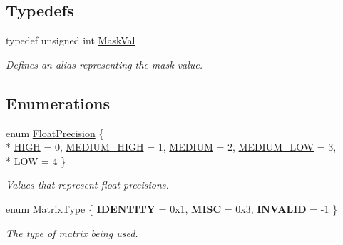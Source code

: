 \subsection*{Typedefs}
\begin{DoxyCompactItemize}
\item 
\hypertarget{group___scalar_math_consts_gab1b391d7995f105a3340b15c6c9d0763}{}typedef unsigned int \hyperlink{group___scalar_math_consts_gab1b391d7995f105a3340b15c6c9d0763}{Mask\+Val}\label{group___scalar_math_consts_gab1b391d7995f105a3340b15c6c9d0763}

\begin{DoxyCompactList}\small\item\em Defines an alias representing the mask value. \end{DoxyCompactList}\end{DoxyCompactItemize}
\subsection*{Enumerations}
\begin{DoxyCompactItemize}
\item 
enum \hyperlink{group___scalar_math_consts_ga4b1c9ff152a66c5d35b4767a57782f63}{Float\+Precision} \{ \\*
\hyperlink{group___scalar_math_consts_gga4b1c9ff152a66c5d35b4767a57782f63a244eee80507aa2a13170d96d214b9104}{H\+I\+G\+H} = 0, 
\hyperlink{group___scalar_math_consts_gga4b1c9ff152a66c5d35b4767a57782f63a8a0bf373c4216f2f3fcc42b6e80f44c2}{M\+E\+D\+I\+U\+M\+\_\+\+H\+I\+G\+H} = 1, 
\hyperlink{group___scalar_math_consts_gga4b1c9ff152a66c5d35b4767a57782f63a01c38b422afce79a2ddb938cf9971b76}{M\+E\+D\+I\+U\+M} = 2, 
\hyperlink{group___scalar_math_consts_gga4b1c9ff152a66c5d35b4767a57782f63ad7e5e2d6d083857d80ec72cb9ff9df15}{M\+E\+D\+I\+U\+M\+\_\+\+L\+O\+W} = 3, 
\\*
\hyperlink{group___scalar_math_consts_gga4b1c9ff152a66c5d35b4767a57782f63a9db1590eafa097de6665238345fdf63e}{L\+O\+W} = 4
 \}
\begin{DoxyCompactList}\small\item\em Values that represent float precisions. \end{DoxyCompactList}\end{DoxyCompactItemize}
{\bf }\par
\begin{DoxyCompactItemize}
\item 
\hypertarget{group___s_i_s_d_mat_math_ga0434ae8f7ee0d8d40277184552eebef4}{}enum \hyperlink{group___s_i_s_d_mat_math_ga0434ae8f7ee0d8d40277184552eebef4}{Matrix\+Type} \{ {\bfseries I\+D\+E\+N\+T\+I\+T\+Y} = 0x1, 
{\bfseries M\+I\+S\+C} = 0x3, 
{\bfseries I\+N\+V\+A\+L\+I\+D} = -\/1
 \}\label{group___s_i_s_d_mat_math_ga0434ae8f7ee0d8d40277184552eebef4}

\begin{DoxyCompactList}\small\item\em The type of matrix being used. \end{DoxyCompactList}\end{DoxyCompactItemize}

